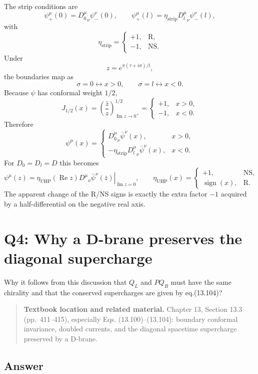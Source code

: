 \documentclass[
  10pt,
  a4paper,
  openany]{book}
\begin{document}
The strip conditions are \[
\psi_+^\mu(0)
={D_0^\mu}_{\nu}\psi_-^\nu(0),
\qquad
\psi_+^\mu(l)
=\eta_{\mathrm{strip}}{D_l^\mu}_{\nu}\psi_-^\nu(l),
\] with \[
\eta_{\mathrm{strip}}
=
\begin{cases}
+1,&\mathrm R,\\
-1,&\mathrm{NS}.
\end{cases}
\] Under \[
z=e^{\pi(\tau+i\sigma)/l},
\] the boundaries map as \[
\sigma=0\longleftrightarrow x>0,
\qquad
\sigma=l\longleftrightarrow x<0.
\] Because \(\psi\) has conformal weight \(1/2\), \[
J_{1/2}(x)
=
\left(\frac{\bar z}{z}\right)^{1/2}_{\operatorname{Im}z\to0^+}
=
\begin{cases}
+1,&x>0,\\
-1,&x<0.
\end{cases}
\] Therefore \[
\boxed{
\psi^\mu(x)
=
\begin{cases}
{D_0^\mu}_{\nu}\bar\psi^\nu(x),&x>0,\\[2mm]
-\eta_{\mathrm{strip}}{D_l^\mu}_{\nu}\bar\psi^\nu(x),&x<0.
\end{cases}
}
\] For \(D_0=D_l=D\) this becomes \[
\boxed{
\left.
\psi^\mu(z)
=
\eta_{\mathrm{UHP}}(\operatorname{Re}z)
{D^\mu}_{\nu}\bar\psi^\nu(\bar z)
\right|_{\operatorname{Im}z=0},
\qquad
\eta_{\mathrm{UHP}}(x)
=
\begin{cases}
+1,&\mathrm{NS},\\
\operatorname{sign}(x),&\mathrm R.
\end{cases}
}
\] The apparent change of the R/NS signs is exactly the extra factor
\(-1\) acquired by a half-differential on the negative real axis.

\section{Q4: Why a D-brane preserves the diagonal
supercharge}\label{q4-why-a-d-brane-preserves-the-diagonal-supercharge}

Why it follows from this discussion that \(Q_{L}\) and \(PQ_{R}\) must
have the same chirality and that the conserved supercharges are given by
eq.(13.104)?

\begin{quote}
\textbf{Textbook location and related material.} Chapter 13, Section
13.3 (pp.~411--415), especially Eqs. (13.100)--(13.104): boundary
conformal invariance, doubled currents, and the diagonal spacetime
supercharge preserved by a D-brane.
\end{quote}

\subsection{Answer}\label{answer-18}
\end{document}
